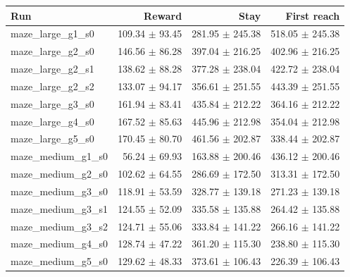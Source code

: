 \begin{tabular}{lrrr}
\toprule
Run & Reward & Stay & First reach\\
\midrule
maze\_large\_g1\_s0 & 109.34 $\pm$ 93.45 & 281.95 $\pm$ 245.38 & 518.05 $\pm$ 245.38\\
maze\_large\_g2\_s0 & 146.56 $\pm$ 86.28 & 397.04 $\pm$ 216.25 & 402.96 $\pm$ 216.25\\
maze\_large\_g2\_s1 & 138.62 $\pm$ 88.28 & 377.28 $\pm$ 238.04 & 422.72 $\pm$ 238.04\\
maze\_large\_g2\_s2 & 133.07 $\pm$ 94.17 & 356.61 $\pm$ 251.55 & 443.39 $\pm$ 251.55\\
maze\_large\_g3\_s0 & 161.94 $\pm$ 83.41 & 435.84 $\pm$ 212.22 & 364.16 $\pm$ 212.22\\
maze\_large\_g4\_s0 & 167.52 $\pm$ 85.63 & 445.96 $\pm$ 212.98 & 354.04 $\pm$ 212.98\\
maze\_large\_g5\_s0 & 170.45 $\pm$ 80.70 & 461.56 $\pm$ 202.87 & 338.44 $\pm$ 202.87\\
maze\_medium\_g1\_s0 & 56.24 $\pm$ 69.93 & 163.88 $\pm$ 200.46 & 436.12 $\pm$ 200.46\\
maze\_medium\_g2\_s0 & 102.62 $\pm$ 64.55 & 286.69 $\pm$ 172.50 & 313.31 $\pm$ 172.50\\
maze\_medium\_g3\_s0 & 118.91 $\pm$ 53.59 & 328.77 $\pm$ 139.18 & 271.23 $\pm$ 139.18\\
maze\_medium\_g3\_s1 & 124.55 $\pm$ 52.09 & 335.58 $\pm$ 135.88 & 264.42 $\pm$ 135.88\\
maze\_medium\_g3\_s2 & 124.71 $\pm$ 55.06 & 333.84 $\pm$ 141.22 & 266.16 $\pm$ 141.22\\
maze\_medium\_g4\_s0 & 128.74 $\pm$ 47.22 & 361.20 $\pm$ 115.30 & 238.80 $\pm$ 115.30\\
maze\_medium\_g5\_s0 & 129.62 $\pm$ 48.33 & 373.61 $\pm$ 106.43 & 226.39 $\pm$ 106.43\\
\bottomrule
\end{tabular}
